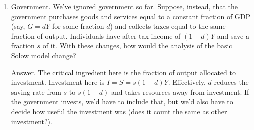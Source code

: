 \begin{enumerate}
\item Government.  We've ignored government so far.  Suppose, instead,
that the government purchases goods and services
equal to a constant fraction of GDP
(say, $ G = d Y$ for some fraction $d$)
 and collects taxes equal to the same fraction of output.
Individuals have after-tax income of $ (1-d) Y$ and save a
fraction $s$ of it.
With these changes, how would the analysis of the basic Solow model change?

Answer.  The critical ingredient here is the fraction of output allocated
to investment.
Investment here is $ I = S = s (1-d) Y $.
Effectively, $d$ reduces the saving rate from $s$ to $s(1-d)$
and takes resources away from investment.
If the government invests, we'd have to include that,
but we'd also have to decide how useful the investment was
(does it count the same as other investment?).

\end{enumerate}
